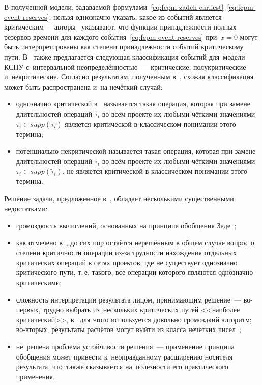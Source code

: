 В полученной модели, задаваемой формулами~\eqref{eq:fcpm-zadeh-earliest}--\eqref{eq:fcpm-event-reserves}, нельзя однозначно указать, какое из событий является критическим~---авторы~\cite{Balashov_IPU} указывают, что функции принадлежности полных резервов времени для каждого события~\eqref{eq:fcpm-event-reserves} при~$x=0$ могут быть интерпретированы как степени принадлежности событий критическому пути. В~\cite{Balashov_IPU} также предлагается следующая классификация событий для~модели КСПУ с~интервальной неопределённостью~--- критические, полукритические и~некритические. Согласно результатам, полученным в~\cite{Chanas_Zielinski_Criticality}, схожая классификация может быть распространена и~на нечёткий случай:
\begin{itemize}
  \item однозначно критической в~\cite{Chanas_Zielinski_Criticality} называется такая операция, которая при замене длительностей операций $\tilde \tau_i$ во всём проекте их любыми чёткими значениями $\tau_i\in supp\left( \tilde \tau_i \right)$ является критической в классическом понимании этого термина;
  \item потенциально некритической называется такая операция, которая при замене длительностей операций $\tilde \tau_i$ во всём проекте их любыми чёткими значениями $\tau_i\in supp\left( \tilde \tau_i \right)$, не является критической в классическом понимании этого термина.
\end{itemize}

Решение задачи, предложенное в~\cite{Balashov_IPU}, обладает несколькими существенными недостатками:
\begin{itemize}
  \item громоздкость вычислений, основанных на принципе обобщения Заде~\cite{Rotshtein, Kruglov_Balashov};
  \item как отмечено в~\cite{Chanas_Zielinski_Criticality}, до сих пор остаётся нерешённым в общем случае вопрос о степени критичности операции из-за трудности нахождения отдельных критических операций в сетях проектов, где не существует однозначно критического пути, т.\,е. такого, все операции которого являются однозначно критическими;
  \item сложность интерпретации результата лицом, принимающим решение~--- во-первых, трудно выбрать из~нескольких критических путей <<наиболее критический>>, в~\cite{Chanas_Zielinski_Criticality} для этого используется довольно громоздкий алгоритм; во-вторых, результаты расчётов могут выйти из класса нечётких чисел~\cite{Fedorova_FCPM_IPU};
  \item не~решена проблема устойчивости решения~--- применение принципа обобщения может привести к~неоправданному расширению носителя результата, что~также сказывается на~полезности его практического применения.
\end{itemize}

